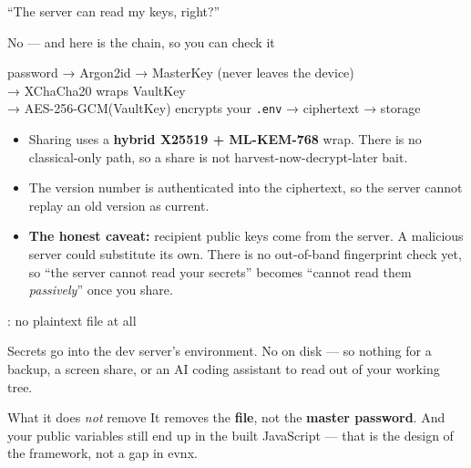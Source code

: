 \documentclass[aspectratio=169,10pt]{beamer}
\begin{document}
\begin{frame}{``The server can read my keys, right?''}
  \small
  \begin{block}{No --- and here is the chain, so you can check it}
    \begin{center}\ttfamily\scriptsize
    password → Argon2id → MasterKey (never leaves the device) \\
    → XChaCha20 wraps VaultKey \\
    → AES-256-GCM(VaultKey) encrypts your \texttt{.env} → ciphertext → storage
    \end{center}
  \end{block}

  \vspace{0.5em}
  \begin{itemize}\small
    \item Sharing uses a \textbf{hybrid X25519 + ML-KEM-768} wrap. There is no
          classical-only path, so a share is not harvest-now-decrypt-later bait.
    \item The version number is authenticated into the ciphertext, so the
          server cannot replay an old version as current.
    \item \textbf{The honest caveat:} recipient public keys come from the
          server. A malicious server could substitute its own. There is no
          out-of-band fingerprint check yet, so ``the server cannot read your
          secrets'' becomes ``cannot read them \emph{passively}'' once you share.
  \end{itemize}
\end{frame}

\begin{frame}[fragile]{: no plaintext file at all}
  \begin{center}\large{}\end{center}

  \vspace{0.8em}
  Secrets go into the dev server's environment. No  on disk ---
  so nothing for a backup, a screen share, or an AI coding assistant to read
  out of your working tree.

  \vspace{0.8em}
  \begin{trap}{What it does \emph{not} remove}
    It removes the \textbf{file}, not the \textbf{master password}. And your
    public variables still end up in the built JavaScript --- that is the
    design of the framework, not a gap in evnx.
  \end{trap}
\end{frame}
\end{document}
